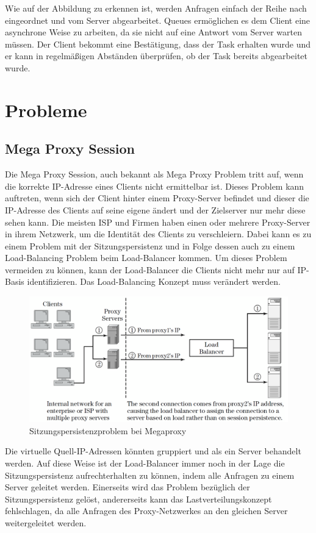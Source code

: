 Wie auf der Abbildung zu erkennen ist, werden Anfragen einfach der Reihe nach eingeordnet und vom Server abgearbeitet. Queues ermöglichen es dem Client eine asynchrone Weise zu arbeiten, da sie nicht auf eine Antwort vom Server warten müssen.
Der Client bekommt eine Bestätigung, dass der Task erhalten wurde und er kann in regelmäßigen Abständen überprüfen, ob der Task bereits abgearbeitet wurde.
\cite{Queues}

\section{Probleme}
\label{sec:Probleme}

\subsection{Mega Proxy Session}
\label{sec:Mega Proxy Session}
Die Mega Proxy Session, auch bekannt als Mega Proxy Problem tritt auf, wenn die korrekte IP-Adresse eines Clients nicht ermittelbar ist. Dieses Problem kann auftreten, wenn sich der Client hinter einem Proxy-Server befindet und dieser die IP-Adresse des Clients auf seine eigene ändert und der Zielserver nur mehr diese sehen kann. Die meisten ISP und Firmen haben einen oder mehrere Proxy-Server in ihrem Netzwerk, um die Identität des Clients zu verschleiern. Dabei kann es zu einem Problem mit der Sitzungspersistenz und in Folge dessen auch zu einem Load-Balancing Problem beim Load-Balancer kommen. Um dieses Problem vermeiden zu können, kann der Load-Balancer die Clients nicht mehr nur auf IP-Basis identifizieren. Das Load-Balancing Konzept muss verändert werden.

\begin{figure}[!h]
	\begin{center}
		\includegraphics[width=0.5\linewidth]{images/MegaProxy1.png}
		\caption{Sitzungspersistenzproblem bei Megaproxy \cite{LoadBalancing2}}
		\label{Sitzungspersistenzproblem_bei_Megaproxy}
	\end{center}
\end{figure}

Die virtuelle Quell-IP-Adressen könnten gruppiert und als ein Server behandelt werden. Auf diese Weise ist der Load-Balancer immer noch in der Lage die Sitzungspersistenz aufrechterhalten zu können, indem alle Anfragen zu einem Server geleitet werden.
Einerseits wird das Problem bezüglich der Sitzungspersistenz gelöst, andererseits kann das Lastverteilungskonzept fehlschlagen, da alle Anfragen des Proxy-Netzwerkes an den gleichen Server weitergeleitet werden.
\cite{LoadBalancing2}

